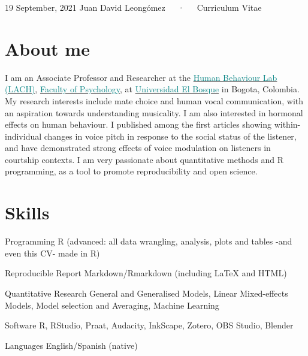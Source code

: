 \documentclass[11pt, a4paper]{awesome-cv}
\begin{document}
\makecvheader

\makecvfooter
  {19 September, 2021}
    {Juan David Leongómez~~~·~~~Curriculum Vitae}
  {\thepage}





\hypertarget{about-me}{%
\section{About me}\label{about-me}}

I am an Associate Professor and Researcher at the
\href{https://www.psicologia.unbosque.edu.co/lach}{\textcolor{teal}{Human Behaviour Lab (LACH)}},
\href{https://www.uelbosque.edu.co/psicologia}{\textcolor{teal}{Faculty of Psychology}},
at
\href{https://www.uelbosque.edu.co/}{\textcolor{teal}{Universidad El Bosque}}
in Bogota, Colombia. My research interests include mate choice and human
vocal communication, with an aspiration towards understanding
musicality. I am also interested in hormonal effects on human behaviour.
I published among the first articles showing within-individual changes
in voice pitch in response to the social status of the listener, and
have demonstrated strong effects of voice modulation on listeners in
courtship contexts. I am very passionate about quantitative methods and
R programming, as a tool to promote reproducibility and open science.

\hypertarget{skills}{%
\section{Skills}\label{skills}}

\begin{cvskills}
  \cvskill
    {Programming}
    {R (advanced: all data wrangling, analysis, plots and tables -and even this CV- made in R)}

  \cvskill
    {Reproducible Report}
    {Markdown/Rmarkdown (including {\selectfont\LaTeX} and HTML)}

  \cvskill
    {Quantitative Research}
    {General and Generalised Models, Linear Mixed-effects Models, Model selection and Averaging, Machine Learning}

  \cvskill
    {Software}
    {R, RStudio, Praat, Audacity, InkScape, Zotero, OBS Studio, Blender}

  \cvskill
    {Languages}
    {English/Spanish (native)}
\end{cvskills}
\end{document}

